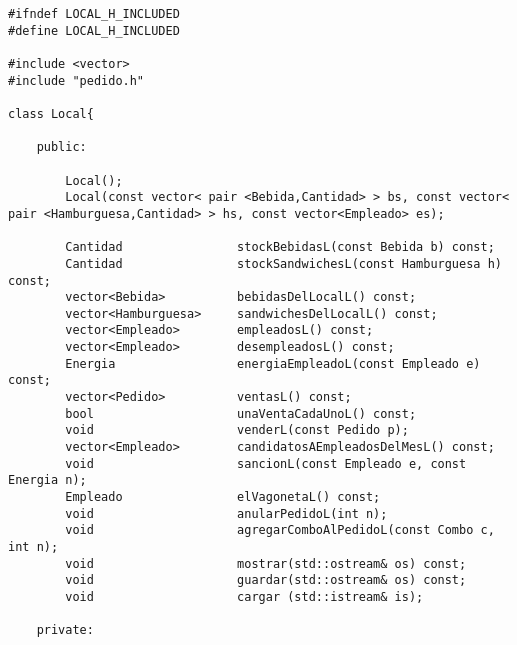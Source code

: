 \begin{lstlisting}
#ifndef LOCAL_H_INCLUDED
#define LOCAL_H_INCLUDED

#include <vector>
#include "pedido.h"

class Local{
    
    public:

        Local();
        Local(const vector< pair <Bebida,Cantidad> > bs, const vector< pair <Hamburguesa,Cantidad> > hs, const vector<Empleado> es);

        Cantidad                stockBebidasL(const Bebida b) const;
        Cantidad                stockSandwichesL(const Hamburguesa h) const;
        vector<Bebida>          bebidasDelLocalL() const;
        vector<Hamburguesa>     sandwichesDelLocalL() const;
        vector<Empleado>        empleadosL() const;
        vector<Empleado>        desempleadosL() const;
        Energia                 energiaEmpleadoL(const Empleado e) const;
        vector<Pedido>          ventasL() const;
        bool                    unaVentaCadaUnoL() const;
        void                    venderL(const Pedido p);
        vector<Empleado>        candidatosAEmpleadosDelMesL() const;
        void                    sancionL(const Empleado e, const Energia n);
        Empleado                elVagonetaL() const;
        void                    anularPedidoL(int n);
        void                    agregarComboAlPedidoL(const Combo c, int n);
        void                    mostrar(std::ostream& os) const;
        void                    guardar(std::ostream& os) const;
        void                    cargar (std::istream& is);

    private:


\end{lstlisting}
